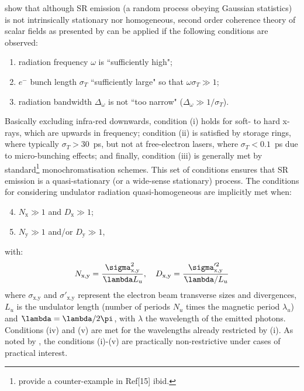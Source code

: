 \documentclass{iucr}              %
\newcommand{\lambdabar}{{\mkern0.75mu\mathchar '26\mkern -8.2mu\lambda}}
\begin{document}
 show that although SR emission (a random process obeying Gaussian statistics) is not intrinsically stationary nor homogeneous, second order coherence theory of scalar fields as presented by  can be applied if the following conditions are observed:
\begin{enumerate}[label=(\roman*)]
\item radiation frequency $\omega$ is ``sufficiently high";
\item $e^-$ bunch length $\sigma_{T}$ ``sufficiently large" so that $\omega\sigma_{T}\gg1$;
\item radiation bandwidth $\Delta_\omega$ is not ``too narrow" ($\Delta_\omega\gg1/\sigma_{T}$).
\end{enumerate}
Basically excluding infra-red downwards, condition (i) holds for soft- to hard x-rays, which are upwards in frequency; condition (ii) is satisfied by storage rings, where typically $\sigma_{T}>30$~ps, but not at free-electron lasers, where $\sigma_{T}<0.1$~ps due to micro-bunching effects; and finally, condition (iii) is generally met by standard\footnote{ provide a counter-example in Ref[15] ibid.} monochromatisation schemes. This set of conditions ensures that SR emission is a quasi-stationary (or a wide-sense stationary) process. The conditions for considering undulator radiation quasi-homogeneous are implicitly met when:
\begin{enumerate}[label=(\roman*)]
\setcounter{enumi}{3}
\item $N_\text{x}\gg1$ and $D_\text{x}\gg1$;
\item $N_\text{y}\gg1$ and/or $D_\text{y}\gg1$,
\end{enumerate}
with:
\begin{equation*}
    N_\text{x,y}=\frac{\sigma^2_\text{x,y}}{\lambdabar L_u}, \quad D_\text{x,y}=\frac{\sigma'^2_\text{x,y}}{\lambdabar/L_u}
\end{equation*}
where $\sigma_\text{x,y}$ and $\sigma'_\text{x,y}$ represent the electron beam transverse sizes and divergences, $L_u$ is the undulator length (number of periods $N_u$ times the magnetic period $\lambda_u$) and $\lambdabar=\lambda/2\pi$, with $\lambda$ the wavelength of the emitted photons. Conditions (iv) and (v) are met for the wavelengths already restricted by (i). As noted by , the conditions (i)-(v) are practically non-restrictive under cases of practical interest.

\end{document}
